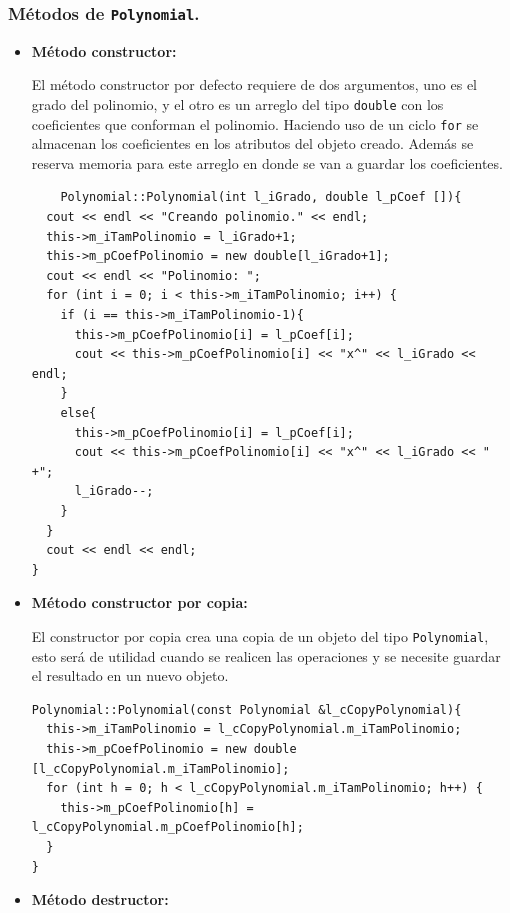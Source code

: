 \subsubsection{Métodos de \texttt{Polynomial}.}
\begin{itemize}
    \item \textbf{Método constructor:}
    
    El método constructor por defecto requiere de dos argumentos, uno es el grado del polinomio, y el otro es un arreglo del tipo \texttt{double} con los coeficientes que conforman el polinomio. Haciendo uso de un ciclo \texttt{for} se almacenan los coeficientes en los atributos del objeto creado. Además se reserva memoria para este arreglo en donde se van a guardar los coeficientes.
    
    \begin{verbatim}
    Polynomial::Polynomial(int l_iGrado, double l_pCoef []){
  cout << endl << "Creando polinomio." << endl;
  this->m_iTamPolinomio = l_iGrado+1;
  this->m_pCoefPolinomio = new double[l_iGrado+1];
  cout << endl << "Polinomio: ";
  for (int i = 0; i < this->m_iTamPolinomio; i++) {
    if (i == this->m_iTamPolinomio-1){
      this->m_pCoefPolinomio[i] = l_pCoef[i];
      cout << this->m_pCoefPolinomio[i] << "x^" << l_iGrado << endl;
    }
    else{
      this->m_pCoefPolinomio[i] = l_pCoef[i];
      cout << this->m_pCoefPolinomio[i] << "x^" << l_iGrado << " +";
      l_iGrado--;
    }
  }
  cout << endl << endl;
}
    \end{verbatim}
    
    \item \textbf{Método constructor por copia:}
    
    El constructor por copia crea una copia de un objeto del tipo \texttt{Polynomial}, esto será de utilidad cuando se realicen las operaciones y se necesite guardar el resultado en un nuevo objeto.
    \begin{verbatim}
Polynomial::Polynomial(const Polynomial &l_cCopyPolynomial){
  this->m_iTamPolinomio = l_cCopyPolynomial.m_iTamPolinomio;
  this->m_pCoefPolinomio = new double [l_cCopyPolynomial.m_iTamPolinomio];
  for (int h = 0; h < l_cCopyPolynomial.m_iTamPolinomio; h++) {
    this->m_pCoefPolinomio[h] = l_cCopyPolynomial.m_pCoefPolinomio[h];
  }
}
    \end{verbatim}
    
    \item \textbf{Método destructor:}
    

\end{itemize}
